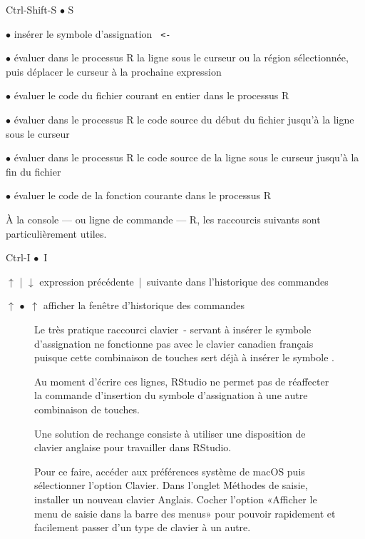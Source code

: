 \begin{ttscript}{Ctrl-Shift-S $\bullet$ \cmdkey\shiftkey S}
  \raggedright
\item[\code{Alt+-} $\bullet$ \code{\optkey\,-}] insérer le
  symbole d'assignation \verb*| <- |
\item[\code{Ctrl+Retour} $\bullet$ \code{\cmdkey\,\returnkey}]
  évaluer dans le processus R la ligne sous le curseur ou la région
  sélectionnée, puis déplacer le curseur à la prochaine expression
\item[\code{Ctrl+Shift+S} $\bullet$ \code{\shiftkey\,\cmdkey\,S}]
  évaluer le code du fichier courant en entier dans le processus R
\item[\code{Ctrl+Alt+B} $\bullet$ \code{\optkey\,\cmdkey\,B}]
  évaluer dans le processus R le code source du début du fichier
  jusqu'à la ligne sous le curseur
\item[\code{Ctrl+Alt+E} $\bullet$ \code{\optkey\,\cmdkey\,E}]
  évaluer dans le processus R le code source de la ligne sous le curseur
  jusqu'à la fin du fichier
\item[\code{Ctrl+Alt+F} $\bullet$ \code{\optkey\,\cmdkey\,F}]
  évaluer le code de la fonction courante dans le processus R
\end{ttscript}

À la console --- ou ligne de commande --- R, les raccourcis suivants
sont particulièrement utiles.
\begin{ttscript}{Ctrl-I $\bullet$ \cmdkey\,I}
  \raggedright
\item[$\uparrow$ | $\downarrow$] expression
  précédente~|~suivante dans l'historique des commandes
\item[\code{Ctrl+}$\uparrow$ $\bullet$ \cmdkey\,$\uparrow$] afficher
  la fenêtre d'historique des commandes
\end{ttscript}

\begin{figure}[t]
  \begin{osx}
    Le très pratique raccourci clavier {\optkey\,-} servant à insérer
    le symbole d'assignation ne fonctionne pas avec le clavier
    canadien français puisque cette combinaison de touches sert déjà à
    insérer le symbole \textbar.

    Au moment d'écrire ces lignes, RStudio ne permet pas de réaffecter
    la commande d'insertion du symbole d'assignation à une autre
    combinaison de touches.

    Une solution de rechange consiste à utiliser une disposition de
    clavier anglaise pour travailler dans RStudio.

    Pour ce faire, accéder aux préférences système de macOS puis
    sélectionner l'option Clavier. Dans l'onglet Méthodes de saisie,
    installer un nouveau clavier Anglais. Cocher l'option «Afficher le
    menu de saisie dans la barre des menus» pour pouvoir rapidement et
    facilement passer d'un type de clavier à un autre.
  \end{osx}
  \label{fig:rstudio:assignation}
\end{figure}


